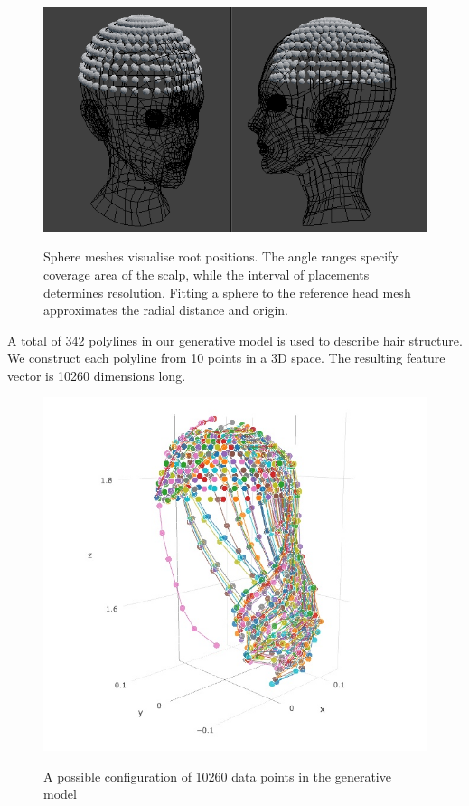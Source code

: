 \documentclass[ %
author={Dillon Keith Diep},
supervisor={Dr. Carl Henrik Ek},
degree={MEng},
title={ART-CG:},
subtitle={Assisted Real-time Content Generation of 3D Hair by Learning Manifolds},
type={Research},
year={2017} ]{dissertation}
\begin{document}
\begin{figure}[!h]
	\centering
	\caption{Sphere meshes visualise root positions. The angle ranges specify coverage area of the scalp, while the interval of placements determines resolution. Fitting a sphere to the reference head mesh approximates the radial distance and origin.}
	\includegraphics[scale=0.5]{images/spherePoints}\\
\end{figure}

A total of 342 polylines in our generative model is used to describe hair structure. We construct each polyline from 10 points in a 3D space. The resulting feature vector is 10260 dimensions long.

\begin{figure}[!h]
	\centering
	\includegraphics[scale=3]{images/generativeModel}\\
	\caption{A possible configuration of 10260 data points in the generative model}
\end{figure}
\end{document}
